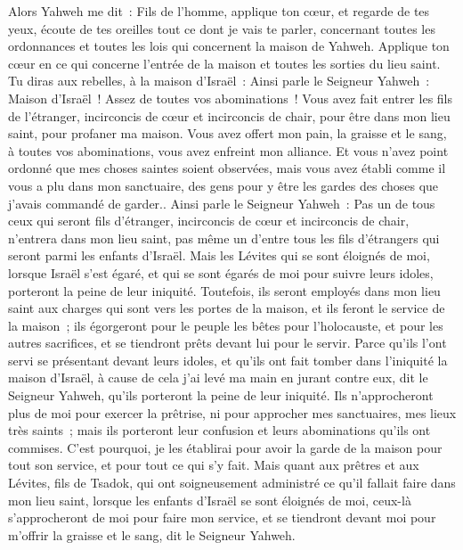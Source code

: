 \begin{multicols}{2}
Alors Yahweh me dit~: Fils de l'homme, applique ton cœur, et regarde de tes yeux, écoute de tes oreilles tout ce dont je vais te parler, concernant toutes les ordonnances et toutes les lois qui concernent la maison de Yahweh. Applique ton cœur en ce qui concerne l'entrée de la maison et toutes les sorties du lieu saint.
Tu diras aux rebelles, à la maison d'Israël~: Ainsi parle le Seigneur Yahweh~: Maison d'Israël~! Assez de toutes vos abominations~!
Vous avez fait entrer les fils de l'étranger, incirconcis de cœur et incirconcis de chair, pour être dans mon lieu saint, pour profaner ma maison. Vous avez offert mon pain, la graisse et le sang, à toutes vos abominations, vous avez enfreint mon alliance.
Et vous n'avez point ordonné que mes choses saintes soient observées, mais vous avez établi comme il vous a plu dans mon sanctuaire, des gens pour y être les gardes des choses que j'avais commandé de garder..
Ainsi parle le Seigneur Yahweh~: Pas un de tous ceux qui seront fils d'étranger, incirconcis de cœur et incirconcis de chair, n'entrera dans mon lieu saint, pas même un d'entre tous les fils d'étrangers qui seront parmi les enfants d'Israël.
Mais les Lévites qui se sont éloignés de moi, lorsque Israël s'est égaré, et qui se sont égarés de moi pour suivre leurs idoles, porteront la peine de leur iniquité.
Toutefois, ils seront employés dans mon lieu saint aux charges qui sont vers les portes de la maison, et ils feront le service de la maison~; ils égorgeront pour le peuple les bêtes pour l'holocauste, et pour les autres sacrifices, et se tiendront prêts devant lui pour le servir.
Parce qu'ils l'ont servi se présentant devant leurs idoles, et qu'ils ont fait tomber dans l'iniquité la maison d'Israël, à cause de cela j'ai levé ma main en jurant contre eux, dit le Seigneur Yahweh, qu'ils porteront la peine de leur iniquité.
Ils n'approcheront plus de moi pour exercer la prêtrise, ni pour approcher mes sanctuaires, mes lieux très saints~; mais ils porteront leur confusion et leurs abominations qu'ils ont commises.
C'est pourquoi, je les établirai pour avoir la garde de la maison pour tout son service, et pour tout ce qui s'y fait.
Mais quant aux prêtres et aux Lévites, fils de Tsadok, qui ont soigneusement administré ce qu'il fallait faire dans mon lieu saint, lorsque les enfants d'Israël se sont éloignés de moi, ceux-là s'approcheront de moi pour faire mon service, et se tiendront devant moi pour m'offrir la graisse et le sang, dit le Seigneur Yahweh.

\end{multicols}
